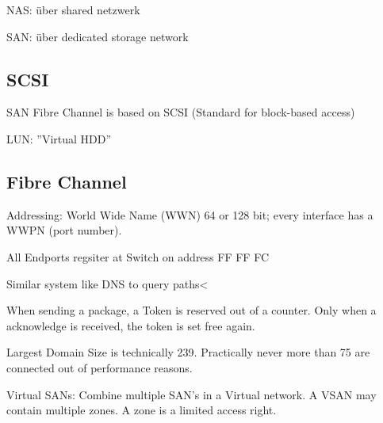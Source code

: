 NAS: über shared netzwerk

SAN: über dedicated storage network

\subsection{SCSI}

SAN Fibre Channel is based on SCSI (Standard for block-based access)

LUN: ''Virtual HDD''

\subsection{Fibre Channel}



Addressing: World Wide Name (WWN) 64 or 128 bit; every interface has a WWPN (port number).

All Endports regsiter at Switch on address FF FF FC

Similar system like DNS to query paths<

When sending a package, a Token is reserved out of a counter. Only when a acknowledge is received, the token is set free again.



Largest Domain Size is technically 239. Practically never more than 75 are connected out of performance reasons.



Virtual SANs: Combine multiple SAN's in a Virtual network. A VSAN may contain multiple zones. A zone is a limited access right.

